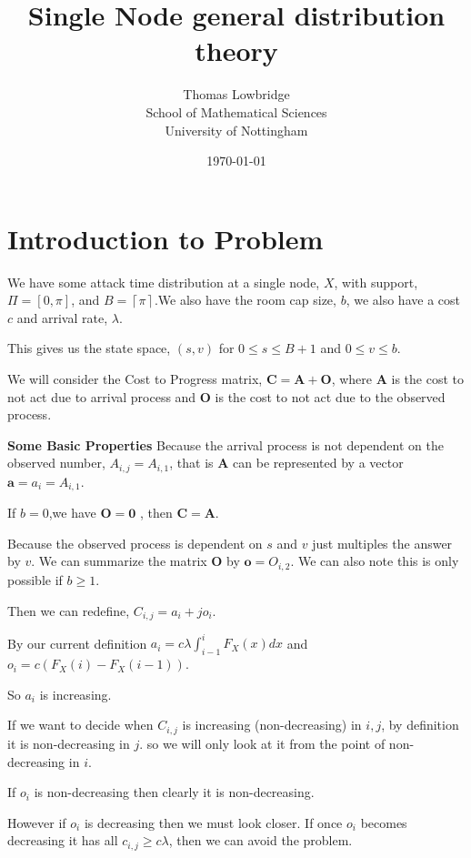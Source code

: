 \documentclass[a4paper,10pt]{article}
\title{Single Node general distribution theory}
\date{\today}
\author{Thomas Lowbridge \\ School of Mathematical Sciences \\ University of Nottingham}
\newcommand{\ceil}[1]{\left \lceil #1 \right \rceil}
\theoremstyle{definition}
\theoremstyle{definition}
\theoremstyle{remark}
\theoremstyle{definition}
\begin{document}
\pagestyle{empty}
{
  \renewcommand{\thispagestyle}[1]{}
  \maketitle
  \tableofcontents  
}
\clearpage
\pagestyle{plain}


\setlength{\parindent}{0pt}
\setlength{\parskip}{1em}

\newpage
{}
\section{Introduction to Problem}
We have some attack time distribution at a single node, $X$, with support, $\Pi=[0,\pi]$, and $B=\ceil{\pi}$.We also have the room cap size, $b$, we also have a cost $c$ and arrival rate, $\lambda$.

This gives us the state space, $(s,v)$ for $0 \leq s \leq B+1$ and $0 \leq v \leq b$.

We will consider the Cost to Progress matrix, $\mathbf{C}=\mathbf{A}+\mathbf{O}$, where $\mathbf{A}$ is the cost to not act due to arrival process and $\mathbf{O}$ is the cost to not act due to the observed process.

\textbf{Some Basic Properties}
Because the arrival process is not dependent on the observed number, $A_{i,j}=A_{i,1}$, that is $\mathbf{A}$ can be represented by a vector $\mathbf{a}=a_{i}=A_{i,1}$.

If $b=0$,we have $\mathbf{O}=\mathbf{0}$ , then $\mathbf{C}=\mathbf{A}$.

Because the observed process is dependent on $s$ and $v$ just multiples the answer by $v$. We can summarize the matrix $\mathbf{O}$ by $\mathbf{o}=O_{i,2}$. We can also note this is only possible if $b \geq 1$.

Then we can redefine, $C_{i,j}=a_{i}+jo_{i}$.



By our current definition $a_{i}= c \lambda \int_{i-1}^{i} F_{X}(x) dx$ and $o_{i}= c (F_{X}(i)-F_{X}(i-1))$.  

So $a_{i}$ is increasing.

If we want to decide when $C_{i,j}$ is increasing (non-decreasing) in $i,j$, by definition it is non-decreasing in $j$. so we will only look at it from the point of non-decreasing in $i$.

If $o_{i}$ is non-decreasing then clearly it is non-decreasing.

However if $o_{i}$ is decreasing then we must look closer. If once $o_{i}$ becomes decreasing it has all $c_{i,j} \geq c \lambda$, then we can avoid the problem.
\end{document}
